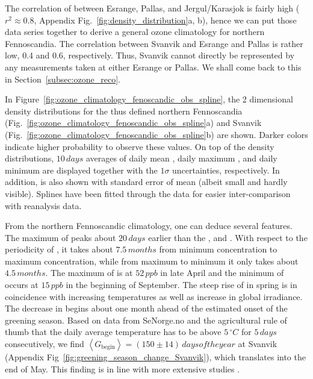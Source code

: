 \documentclass[bg, manuscript]{copernicus}
\begin{document}
The correlation of \chem{[O_3]} between Esrange, Pallas, and Jergul/Karasjok is fairly high ($r^2\approx 0.8$, Appendix Fig.~\ref{fig:density_distribution}a, b), hence we can put those data series together to derive a general ozone climatology for northern Fennoscandia. The correlation between Svanvik and Esrange and Pallas is rather low, 0.4 and 0.6, respectively. Thus, Svanvik cannot directly be represented by any measurements taken at either Esrange or Pallas. We shall come back to this in Section~\ref{subsec:ozone_reco}.

In Figure~\ref{fig:ozone_climatology_fenoscandic_obs_spline}, the 2 dimensional density distributions for the thus defined northern Fennoscandia (Fig.~\ref{fig:ozone_climatology_fenoscandic_obs_spline}a) and Svanvik (Fig.~\ref{fig:ozone_climatology_fenoscandic_obs_spline}b) are shown. Darker colors indicate higher probability to observe these values. On top of the density distributions, $10\,\unit{days}$ averages of daily mean , daily maximum , and daily minimum  are displayed together with the $1 \sigma$ uncertainties, respectively. In addition,  is also shown with standard error of mean (albeit small and hardly visible). Splines have been fitted through the data for easier inter-comparison with reanalysis data.

From the northern Fennoscandic climatology, one can deduce several features. The maximum of  peaks about $20\,\unit{days}$ earlier than the , and . With respect to the periodicity of , it takes about $7.5\,\unit{months}$ from minimum concentration to maximum concentration, while from maximum to minimum it only takes about $4.5\,\unit{months}$. The maximum of  is at $52\,\unit{ppb}$ in late April and the minimum of  occurs at $15\,\unit{ppb}$ in the beginning of September. The steep rise of  in spring is in coincidence with increasing temperatures as well as increase in global irradiance. The decrease in  begins about one month ahead of the estimated onset of the greening season. Based on data from SeNorge.no and the agricultural rule of thumb that the daily average temperature has to be above $5\,\unit{^\circ C}$ for $5\,\unit{days}$ consecutively, we find $\left<G_\mathrm{begin}\right> = (150 \pm 14)\,\unit{days of the year}$ at Svanvik (Appendix Fig~\ref{fig:greening_season_change_Svanvik}), which translates into the end of May. This finding is in line with more extensive studies \citep[][e.g.,]{IJB:Karlsen2007,AFM:Linderholm}.
\end{document}
